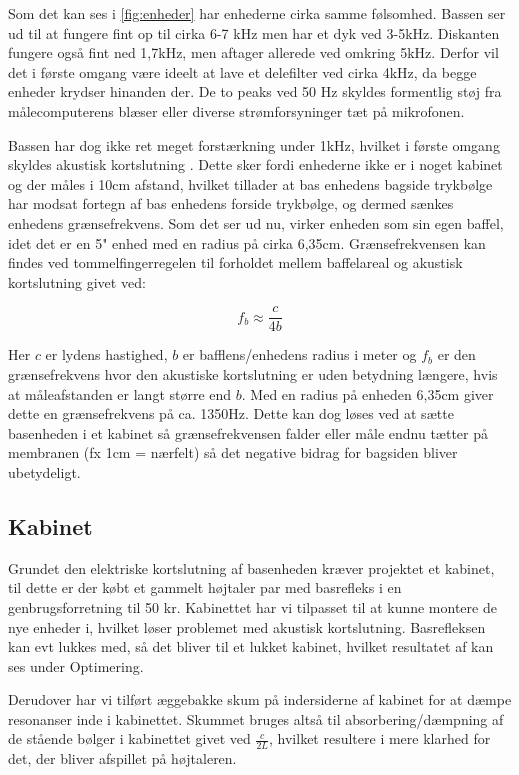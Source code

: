 Som det kan ses i \autoref{fig:enheder} har enhederne cirka samme følsomhed. Bassen ser ud til at fungere fint op til cirka 6-7 kHz men har et dyk ved 3-5kHz. Diskanten fungere også fint ned 1,7kHz, men aftager allerede ved omkring 5kHz. Derfor vil det i første omgang være ideelt at lave et delefilter ved cirka 4kHz, da begge enheder krydser hinanden der. De to peaks ved 50 Hz skyldes formentlig støj fra målecomputerens blæser eller diverse strømforsyninger tæt på mikrofonen.

Bassen har dog ikke ret meget forstærkning under 1kHz, hvilket i første omgang skyldes akustisk kortslutning \cite[side 24]{Elektroakustik}. Dette sker fordi enhederne ikke er i noget kabinet og der måles i 10cm afstand, hvilket tillader at bas enhedens bagside trykbølge har modsat fortegn af bas enhedens forside trykbølge, og dermed sænkes enhedens grænsefrekvens. Som det ser ud nu, virker enheden som sin egen baffel, idet det er en 5" enhed med en radius på cirka 6,35cm. Grænsefrekvensen kan findes ved tommelfingerregelen til forholdet mellem baffelareal og akustisk kortslutning givet ved: \cite[side 44]{Elektroakustik}

\begin{equation}
f_b \approx \frac{c} {4 b} 
\end{equation}

Her $c$ er lydens hastighed, $b$ er bafflens/enhedens radius i meter og $f_b$ er den grænsefrekvens hvor den akustiske kortslutning er uden betydning længere, hvis at måleafstanden er langt større end $b$. Med en radius på enheden 6,35cm giver dette en grænsefrekvens på ca. 1350Hz. Dette kan dog løses ved at sætte basenheden i et kabinet så grænsefrekvensen falder eller måle endnu tætter på membranen (fx 1cm = nærfelt) så det negative bidrag for bagsiden bliver ubetydeligt. 

\subsection{Kabinet}
Grundet den elektriske kortslutning af basenheden kræver projektet et kabinet, til dette er der købt et gammelt højtaler par med basrefleks i en genbrugsforretning til 50 kr. Kabinettet har vi tilpasset til at kunne montere de nye enheder i, hvilket løser problemet med akustisk kortslutning. Basrefleksen kan evt lukkes med, så det bliver til et lukket kabinet, hvilket resultatet af kan ses under Optimering.

Derudover har vi tilført æggebakke skum på indersiderne af kabinet for at dæmpe resonanser inde i kabinettet. Skummet bruges altså til absorbering/dæmpning af de stående bølger i kabinettet givet ved $ \frac{c}{2L} $, hvilket resultere i mere klarhed for det, der bliver afspillet på højtaleren.

